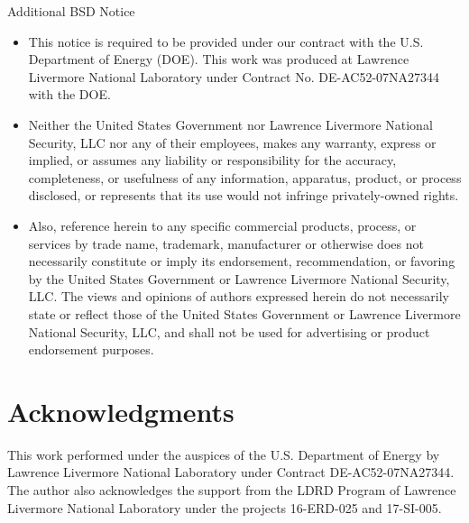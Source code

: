 \documentclass[11pt]{article}
\begin{document}
\begin{center}
{\begin{minipage}{0.9\textwidth}
\medskip

Additional BSD Notice
\begin{itemize}
\item[1.] This notice is required to be provided under our contract with the U.S. Department 
of Energy (DOE). This work was produced at Lawrence Livermore National Laboratory under 
Contract No. DE-AC52-07NA27344 with the DOE.
\item[2.] Neither the United States Government nor Lawrence Livermore National Security, LLC 
nor any of their employees, makes any warranty, express or implied, or assumes any 
liability or responsibility for the accuracy, completeness, or usefulness of any 
information, apparatus, product, or process disclosed, or represents that its use would
not infringe privately-owned rights.
\item[3.] Also, reference herein to any specific commercial products, process, or services by 
trade name, trademark, manufacturer or otherwise does not necessarily constitute or 
imply its endorsement, recommendation, or favoring by the United States Government or 
Lawrence Livermore National Security, LLC. The views and opinions of authors expressed 
herein do not necessarily state or reflect those of the United States Government or 
Lawrence Livermore National Security, LLC, and shall not be used for advertising or 
product endorsement purposes.
\end{itemize}
\end{minipage}}\end{center}

\section{Acknowledgments}
This work performed under the auspices of the U.S. Department of Energy by Lawrence Livermore National Laboratory under Contract DE-AC52-07NA27344. The author also acknowledges the support from the LDRD Program of Lawrence Livermore National Laboratory under the projects 16-ERD-025 and 17-SI-005.









\end{document}
